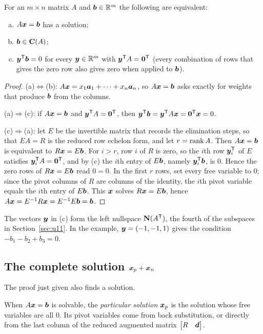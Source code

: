 \begin{theorem}[Solvability]\label{thm:u09-solvable}
For an $m\times n$ matrix $A$ and $\boldsymbol{b}\in\mathbb{R}^m$ the following are equivalent:
\begin{enumerate}[(a)]
\item $A\boldsymbol{x}=\boldsymbol{b}$ has a solution;
\item $\boldsymbol{b}\in\mathbf{C}(A)$;
\item $\boldsymbol{y}^{\mathsf{T}}\boldsymbol{b}=0$ for every $\boldsymbol{y}\in\mathbb{R}^m$ with $\boldsymbol{y}^{\mathsf{T}} A=\boldsymbol{0}^{\mathsf{T}}$ (every combination of
rows that gives the zero row also gives zero when applied to $\boldsymbol{b}$).
\end{enumerate}
\end{theorem}
\begin{proof}
(a)$\Leftrightarrow$(b): $A\boldsymbol{x}=x_1\boldsymbol{a}_1+\dots+x_n\boldsymbol{a}_n$, so $A\boldsymbol{x}=\boldsymbol{b}$ asks
exactly for weights that produce $\boldsymbol{b}$ from the columns.

(a)$\Rightarrow$(c): if $A\boldsymbol{x}=\boldsymbol{b}$ and $\boldsymbol{y}^{\mathsf{T}} A=\boldsymbol{0}^{\mathsf{T}}$, then
$\boldsymbol{y}^{\mathsf{T}}\boldsymbol{b}=\boldsymbol{y}^{\mathsf{T}} A\boldsymbol{x}=\boldsymbol{0}^{\mathsf{T}}\boldsymbol{x}=0$.

(c)$\Rightarrow$(a): let $E$ be the invertible matrix that records the elimination steps, so that
$EA=R$ is the reduced row echelon form, and let $r=\operatorname{rank} A$. Then $A\boldsymbol{x}=\boldsymbol{b}$ is equivalent
to $R\boldsymbol{x}=E\boldsymbol{b}$. For $i>r$, row $i$ of $R$ is zero, so the $i$th row $\boldsymbol{y}_i^{\mathsf{T}}$ of $E$
satisfies $\boldsymbol{y}_i^{\mathsf{T}} A=\boldsymbol{0}^{\mathsf{T}}$, and by (c) the $i$th entry of $E\boldsymbol{b}$, namely
$\boldsymbol{y}_i^{\mathsf{T}}\boldsymbol{b}$, is $0$. Hence the zero rows of $R\boldsymbol{x}=E\boldsymbol{b}$ read $0=0$. In the first
$r$ rows, set every free variable to $0$; since the pivot columns of $R$ are columns of the
identity, the $i$th pivot variable equals the $i$th entry of $E\boldsymbol{b}$. This $\boldsymbol{x}$ solves
$R\boldsymbol{x}=E\boldsymbol{b}$, hence $A\boldsymbol{x}=E^{-1}R\boldsymbol{x}=E^{-1}E\boldsymbol{b}=\boldsymbol{b}$.
\end{proof}

The vectors $\boldsymbol{y}$ in (c) form the left nullspace $\mathbf{N}(A^{\mathsf{T}})$, the fourth of the subspaces in
Section~\ref{sec:u11}. In the example, $\boldsymbol{y}=(-1,-1,1)$ gives the condition
$-b_1-b_2+b_3=0$.

\subsection{The complete solution \texorpdfstring{\(\boldsymbol{x}_p+\boldsymbol{x}_n\)}{xp + xn}}

The proof just given also finds a solution.

\begin{definition}\label{def:u09-particular}
When $A\boldsymbol{x}=\boldsymbol{b}$ is solvable, the \emph{particular solution} $\boldsymbol{x}_p$ is the solution whose
free variables are all $0$. Its pivot variables come from back substitution, or directly from the
last column of the reduced augmented matrix $\begin{bmatrix}R&\boldsymbol{d}\end{bmatrix}$.
\end{definition}

